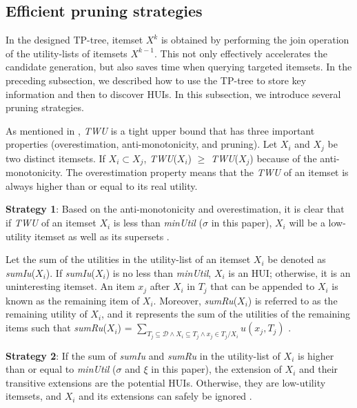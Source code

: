 \documentclass[journal]{IEEEtran}
\begin{document}
\subsection{Efficient pruning strategies}

In the designed TP-tree, itemset $X^{k}$ is obtained by performing the join operation of the utility-lists of itemsets $X^{k-1}$. This not only effectively accelerates the candidate generation, but also saves time when querying targeted itemsets. In the preceding subsection, we described how to use the TP-tree to store key information and then to discover HUIs. In this subsection, we introduce several pruning strategies.



As mentioned in \cite{liu2005two, fournier2014fhm, zida2017efim}, \textit{TWU} is a tight upper bound that has three important properties (overestimation, anti-monotonicity, and pruning). Let $X_i$ and $X_j$ be two distinct itemsets. If $X_i \subset X_j$, \textit{TWU}($X_i$) $\ge$ \textit{TWU}($X_j$) because of the anti-monotonicity. The overestimation property means that the \textit{TWU} of an itemset is always higher than or equal to its real utility.

\textbf{Strategy 1}: Based on the anti-monotonicity and overestimation, it is clear that if \textit{TWU} of an itemset $X_i$ is less than \textit{minUtil} ($\sigma$ in this paper), $X_i$ will be a low-utility itemset as well as its supersets \cite{liu2005two}.


Let the sum of the utilities in the utility-list of an itemset $X_i$ be denoted as \textit{sumIu}($X_i$). If \textit{sumIu}($X_i$) is no less than \textit{minUtil}, $X_i$ is an HUI; otherwise, it is an uninteresting itemset. An item $x_j$ after $X_i$ in $T_j$ that can be appended to $X_i$ is known as the remaining item of $X_i$. Moreover, \textit{sumRu}($X_i$) is referred to as the remaining utility of $X_i$, and it represents the sum of the utilities of the remaining items such that \textit{sumRu}($X_i$) = $\sum_{T_j \subseteq \mathcal{D} \land X_i \subseteq T_j \wedge x_j \in T_j/X_i}$$u(x_j, T_j)$ \cite{liu2012mining}.

\textbf{Strategy 2}: If the sum of \textit{sumIu} and \textit{sumRu} in the utility-list of $X_i$ is higher than or equal to \textit{minUtil} ($\sigma$ and $\xi$ in this paper), the extension of $X_i$ and their transitive extensions are the potential HUIs. Otherwise, they are low-utility itemsets, and $X_i$ and its extensions can safely be ignored \cite{liu2012mining}.
\end{document}
